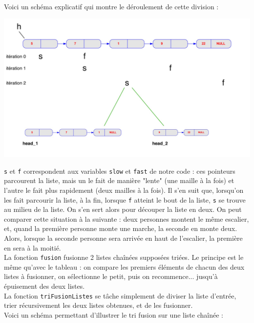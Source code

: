 \documentclass[11pt]{article}
\begin{document}
Voici un schéma explicatif qui montre le déroulement de cette division : 

\begin{center}
\includegraphics[scale=0.25]{images/2.jpg}
\end{center}

\texttt{s} et \texttt{f} correspondent aux variables \texttt{slow} et \texttt{fast} de notre code : ces pointeurs parcourent la liste, mais un le fait de manière "lente" (une maille à la fois) et l'autre le fait plus rapidement (deux mailles à la fois). Il s'en suit que, lorsqu'on les fait parcourir la liste, à la fin, lorsque \texttt{f} atteint le bout de la liste, \texttt{s} se trouve au milieu de la liste. On s'en sert alors pour découper la liste en deux. On peut comparer cette situation à la suivante : deux personnes montent le même escalier, et, quand la première personne monte une marche, la seconde en monte deux. Alors, lorsque la seconde personne sera arrivée en haut de l'escalier, la première en sera à la moitié. \\


La fonction \texttt{fusion} fusionne 2 listes chaînées supposées triées. Le principe est le même qu'avec le tableau : on compare les premiers éléments de chacun des deux listes à fusionner, on sélectionne le petit, puis on recommence... jusqu'à épuisement des deux listes. \\

La fonction \texttt{triFusionListes} se tâche simplement de diviser la liste d'entrée, trier récursivement les deux listes obtenues, et de les fusionner. \\

Voici un schéma permettant d'illustrer le tri fusion sur une liste chaînée :
\end{document}
